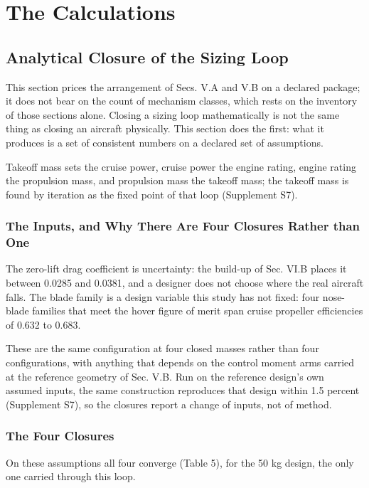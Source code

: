 \documentclass[journal]{new-aiaa}
\begin{document}
\section{The Calculations}

\subsection{Analytical Closure of the Sizing Loop}

This section prices the arrangement of Secs. V.A and V.B on a declared package; it does not bear on the count of mechanism classes, which rests on the inventory of those sections alone. Closing a sizing loop mathematically is not the same thing as closing an aircraft physically. This section does the first: what it produces is a set of consistent numbers on a declared set of assumptions.

Takeoff mass sets the cruise power, cruise power the engine rating, engine rating the propulsion mass, and propulsion mass the takeoff mass; the takeoff mass is found by iteration as the fixed point of that loop (Supplement S7).

\subsubsection{The Inputs, and Why There Are Four Closures Rather than One}

The zero-lift drag coefficient is uncertainty: the build-up of Sec. VI.B places it between 0.0285 and 0.0381, and a designer does not choose where the real aircraft falls. The blade family is a design variable this study has not fixed: four nose-blade families that meet the hover figure of merit span cruise propeller efficiencies of 0.632 to 0.683.

These are the same configuration at four closed masses rather than four configurations, with anything that depends on the control moment arms carried at the reference geometry of Sec. V.B. Run on the reference design's own assumed inputs, the same construction reproduces that design within 1.5 percent (Supplement S7), so the closures report a change of inputs, not of method.

\subsubsection{The Four Closures}

On these assumptions all four converge (Table 5), for the 50 kg design, the only one carried through this loop.
\end{document}
